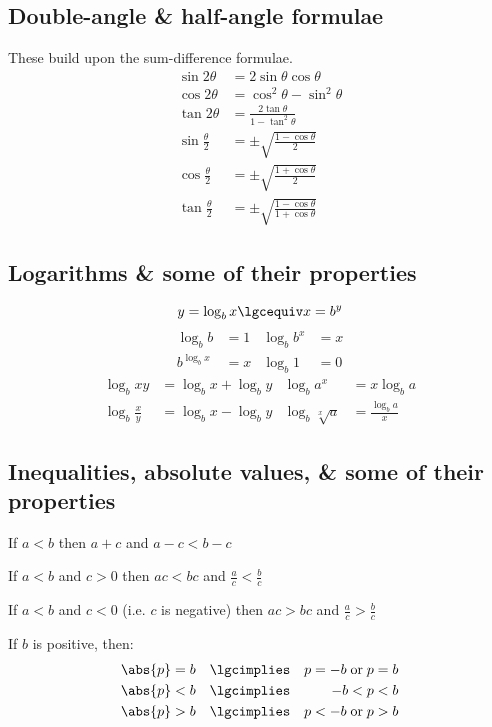 \documentclass[main.tex]{subfiles}
\begin{document}
\begin{multicols}{2}
		\subsection*{Double-angle \& half-angle formulae}
		These build upon the sum-difference formulae.
		\begin{align*}
			\sin{2\theta} &= 2\sin{\theta}\cos{\theta} \\
			\cos{2\theta} &= \cos^2{\theta} - \sin^2{\theta} \\
			\tan{2\theta} &= \frac{2\tan{\theta}}{1 - \tan^2\theta} \\
			\sin{\frac{\theta}{2}} &= \pm \sqrt{\frac{1 - \cos\theta}{2}} \\
			\cos{\frac{\theta}{2}} &= \pm \sqrt{\frac{1 + \cos\theta}{2}}\\
			\tan{\frac{\theta}{2}} &= \pm \sqrt{\frac{1 - \cos\theta}{1 + \cos\theta}}
		\end{align*}

		\subsection*{Logarithms \& some of their properties}
		\[y = \log_{b}x \lgcequiv x = b^{y}\]
		\begin{align*}
			\log_{b}{b} &= 1 & \log_{b}{b^x} &= x \\
			b^{\log_{b}{x}} &= x & \log_{b}{1} &= 0
		\end{align*}
		\begin{align*}
			\log_{b}{xy} &= \log_{b}{x} + \log_{b}{y} & \log_{b}{a^x} &= x \log_{b}{a} \\
			\log_{b}{\frac{x}{y}} &= \log_{b}{x} - \log_{b}{y} & \log_{b}{\sqrt[x]{a}} &= \frac{\log_{b}{a}}{x}
		\end{align*}

		\subsection*{Inequalities, absolute values, \& some of their properties}
		If \(a < b\) then \(a + c\) and \(a - c < b - c\)

		If \(a < b\) and \(c > 0\) then \(ac < bc\) and \(\frac{a}{c} < \frac{b}{c}\)

		If \(a < b\) and \(c < 0\) (i.e. \(c\) is negative) then \(ac > bc\) and \(\frac{a}{c} > \frac{b}{c}\)

		If \(b\) is positive, then:
		\begin{align*}  %
			\abs{p} &= b &\lgcimplies && p = -b \; \text{or} \; p = b \\
			\abs{p} &< b &\lgcimplies && -b < p < b \\
			\abs{p} &> b &\lgcimplies && p < -b \; \text{or} \; p > b
		\end{align*}
	\end{multicols}
\end{document}
